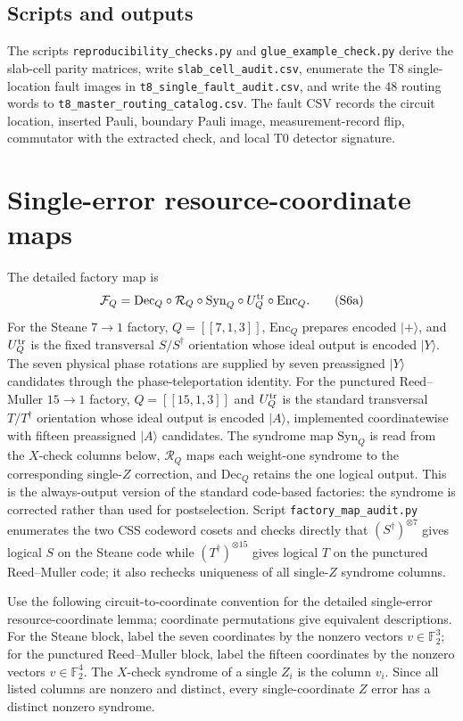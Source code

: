 \documentclass[aps,prx,reprint,superscriptaddress,nofootinbib,floatfix,longbibliography]{revtex4-2}
\theoremstyle{definition}
\begin{document}
\subsection{Scripts and outputs}
The scripts \texttt{reproducibility\_checks.py} and \texttt{glue\_example\_check.py} derive the slab-cell parity matrices, write \texttt{slab\_cell\_audit.csv}, enumerate the T8 single-location fault images in \texttt{t8\_single\_fault\_audit.csv}, and write the 48 routing words to \texttt{t8\_master\_routing\_catalog.csv}.  The fault CSV records the circuit location, inserted Pauli, boundary Pauli image, measurement-record flip, commutator with the extracted check, and local T0 detector signature.

\section{Single-error resource-coordinate maps}\label{sec:resource-maps}

The detailed factory map is
\begin{equation}
 \mathcal F_Q=\mathrm{Dec}_Q\circ\mathcal R_Q\circ\mathrm{Syn}_Q
 \circ U_Q^{\rm tr}\circ\mathrm{Enc}_Q .
 \tag{S6a}
\end{equation}
For the Steane $7\!\to\!1$ factory, $Q=[[7,1,3]]$, $\mathrm{Enc}_Q$
prepares encoded $|+\rangle$, and $U_Q^{\rm tr}$ is the fixed transversal
$S/S^\dagger$ orientation whose ideal output is encoded $|Y\rangle$.  The
seven physical phase rotations are supplied by seven preassigned $|Y\rangle$
candidates through the phase-teleportation identity.  For the punctured
Reed--Muller $15\!\to\!1$ factory, $Q=[[15,1,3]]$ and $U_Q^{\rm tr}$ is the
standard transversal $T/T^\dagger$ orientation whose ideal output is encoded
$|A\rangle$, implemented coordinatewise with fifteen preassigned $|A\rangle$
candidates.  The syndrome map $\mathrm{Syn}_Q$ is read from the $X$-check
columns below, $\mathcal R_Q$ maps each weight-one syndrome to the corresponding
single-$Z$ correction, and $\mathrm{Dec}_Q$ retains the one logical output.
This is the always-output version of the standard code-based factories: the syndrome is corrected rather than used for postselection.  Script \texttt{factory\_map\_audit.py} enumerates the two CSS codeword cosets and checks directly that $(S^\dagger)^{\otimes7}$ gives logical $S$ on the Steane code while $(T^\dagger)^{\otimes15}$ gives logical $T$ on the punctured Reed--Muller code; it also rechecks uniqueness of all single-$Z$ syndrome columns.


Use the following circuit-to-coordinate convention for the detailed single-error resource-coordinate lemma; coordinate permutations give equivalent descriptions.  For the Steane block, label the seven coordinates by the nonzero vectors $v\in\mathbb F_2^3$; for the punctured Reed--Muller block, label the fifteen coordinates by the nonzero vectors $v\in\mathbb F_2^4$.  The $X$-check syndrome of a single $Z_i$ is the column $v_i$.  Since all listed columns are nonzero and distinct, every single-coordinate $Z$ error has a distinct nonzero syndrome.
\end{document}
